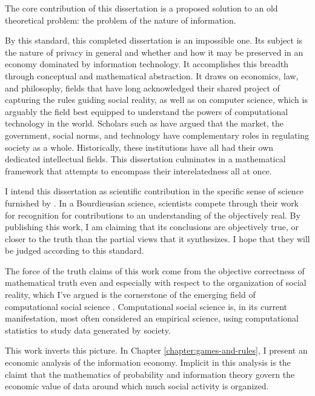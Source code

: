 \documentclass[../thesis.tex]{subfiles}
\begin{document}
 The core contribution of this dissertation is a proposed
 solution to an old theoretical problem: the problem of the
 nature of information.
 
 
 \citet{buckland1991information}
 \citet{nunberg1996farewell}
 \citet{brier2008cybersemiotics}
 \citet{sep-information-semantic}
 \citet{horvitz2015data}
 
 By this standard, this completed dissertation is an impossible
 one.
 Its subject is the nature of privacy in general and whether and how it may be preserved in an economy dominated by information technology.
 It accomplishes this breadth through conceptual and mathematical
 abstraction.
 It draws on economics, law, and philosophy, fields that have long acknowledged their shared project of capturing the rules guiding social reality, as well as on computer science, which is arguably the field best equipped to understand the powers of computational technology in the world.
 Scholars such as \citet{lessig1999code} have argued that the market, the government, social norms, and technology have complementary roles in regulating society as a whole.
 Historically, these institutions have all had their own dedicated intellectual fields.
 This dissertation culminates in a mathematical framework that attempts to encompass their interelatedness all at once.

 I intend this dissertation as scientific contribution
 in the specific sense of science furnished by
 \citet{bourdieu2004science}.
 In a Bourdieusian science, scientists compete through their work
 for recognition for contributions to an understanding of the
 objectively real.
 By publishing this work, I am claiming that its conclusions
 are objectively true, or closer to the truth than the partial
 views that it synthesizes.
 I hope that they will be judged according to this standard.

 The force of the truth claims of this work come from the
 objective correctness of mathematical truth even and especially
 with respect to the organization of social reality, which I've
 argued is the cornerstone of the emerging field of
 computational social science \citep{benthall2016philosophy}.
 Computational social science is, in its current manifestation,
 most often considered an empirical science, using computational
 statistics to study data generated by society.

 This work inverts this picture.
 In Chapter \ref{chapter:games-and-rules}, I present
 an economic analysis of the information economy.
 Implicit in this analysis is the claimt that
 the mathematics of probability and information theory
 govern the economic value of data around which much
 social activity is organized.
\end{document}
